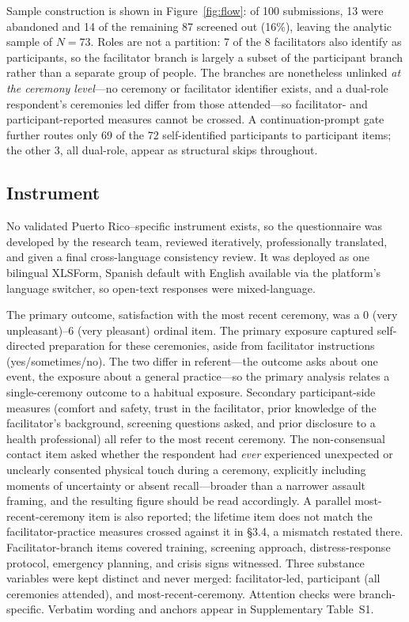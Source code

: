 \documentclass[12pt]{article}
\begin{document}
Sample construction is shown in Figure~\ref{fig:flow}: of 100 submissions, 13 were abandoned and 14 of the
remaining 87 screened out (16\%), leaving the analytic sample of $N=73$. Roles are not a partition: 7 of the
8 facilitators also identify as participants, so the facilitator branch is largely a subset of the
participant branch rather than a separate group of people. The branches are nonetheless unlinked \emph{at
the ceremony level}---no ceremony or facilitator identifier exists, and a dual-role respondent's ceremonies
led differ from those attended---so facilitator- and participant-reported measures cannot be crossed. A
continuation-prompt gate further routes only 69 of the 72 self-identified participants to participant items;
the other 3, all dual-role, appear as structural skips throughout.

\subsection{Instrument}

No validated Puerto Rico--specific instrument exists, so the questionnaire was developed by the research
team, reviewed iteratively, professionally translated, and given a final cross-language consistency review.
It was deployed as one bilingual XLSForm, Spanish default with English available via the platform's language
switcher, so open-text responses were mixed-language.

The primary outcome, satisfaction with the most recent ceremony, was a 0 (very unpleasant)--6 (very
pleasant) ordinal item. The primary exposure captured self-directed preparation for these ceremonies, aside
from facilitator instructions (yes/sometimes/no). The two differ in referent---the outcome asks about one
event, the exposure about a general practice---so the primary analysis relates a single-ceremony outcome to
a habitual exposure. Secondary participant-side measures (comfort and safety, trust in the facilitator,
prior knowledge of the facilitator's background, screening questions asked, and prior disclosure to a health
professional) all refer to the most recent ceremony. The non-consensual contact item asked whether the
respondent had \emph{ever} experienced unexpected or unclearly consented physical touch during a ceremony,
explicitly including moments of uncertainty or absent recall---broader than a narrower assault framing, and
the resulting figure should be read accordingly. A parallel most-recent-ceremony item is also reported; the
lifetime item does not match the facilitator-practice measures crossed against it in \S3.4, a mismatch
restated there. Facilitator-branch items covered training, screening approach, distress-response protocol,
emergency planning, and crisis signs witnessed. Three substance variables were kept distinct and never
merged: facilitator-led, participant (all ceremonies attended), and most-recent-ceremony. Attention checks
were branch-specific. Verbatim wording and anchors appear in Supplementary Table~S1.
\end{document}
